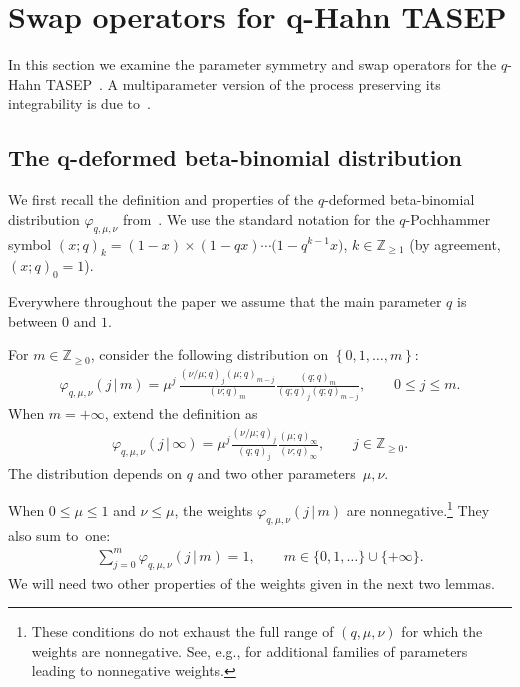 \section[Swap operators for q-Hahn TASEP]{Swap operators for $\boldsymbol q$-Hahn TASEP}\label{sec:qhahn_TASEP}

{\sloppy
In this section we examine the parameter symmetry and swap operators for the
$q$-Hahn TASEP~\cite{Povolotsky2013}.
A multiparameter version of the process
preserving its integrability is due to~\cite{BorodinPetrov2016inhom}.

}

\subsection[The q-deformed beta-binomial distribution]
{The $\boldsymbol q$-deformed beta-binomial distribution}\label{sub:phi_distribution}

We first recall the definition and properties of
the $q$-deformed beta-binomial distribution
$\varphi_{q,\mu,\nu}$ from~\cite{Corwin2014qmunu, Povolotsky2013}.
We use the standard notation for the $q$-Pochhammer symbol
$(x;q)_k=(1-x)\times(1-qx)\cdots\big(1-q^{k-1}x\big)$, $k\in \mathbb{Z}_{\ge1}$
(by agreement, $(x;q)_0=1$).

Everywhere throughout the paper we
assume that the main parameter $q$ is between $0$ and $1$.

\begin{Definition}
	\label{def:phi_distribution}
	For $m\in \mathbb{Z}_{\ge0}$, consider the following distribution on
	$\left\{ 0,1,\ldots,m \right\}$:
	\begin{gather*}
		\varphi_{q,\mu,\nu}(j\,|\, m)=
		\mu^j\,\frac{(\nu/\mu;q)_j(\mu;q)_{m-j}}{(\nu;q)_m}
		\frac{(q;q)_m}{(q;q)_j(q;q)_{m-j}},
		\qquad
		0\le j\le m.
	\end{gather*}
	When $m=+\infty$, extend the definition as
	\begin{gather*}
		\varphi_{q,\mu,\nu}(j\,|\, \infty)=
		\mu^j\frac{(\nu/\mu;q)_j}{(q;q)_j}\frac{(\mu;q)_\infty}{(\nu;q)_\infty},
		\qquad
		j\in \mathbb{Z}_{\ge0}.
	\end{gather*}
	The distribution depends on $q$
	and two other parameters~$\mu,\nu$.
\end{Definition}

When $0\le \mu\le 1$ and $\nu\le \mu$, the weights $\varphi_{q,\mu,\nu}(j\,|\, m)$
are nonnegative.\footnote{These conditions do not
exhaust the full range of $(q,\mu,\nu)$
for which the weights are nonnegative.
See, e.g., \cite[Section 6.6.1]{BorodinPetrov2016inhom}
for additional families of parameters leading to nonnegative weights.}
They also sum to~one:
\begin{gather*}
\sum_{j=0}^{m}\varphi_{q,\mu,\nu}(j\,|\, m)=1,\qquad m\in\{ 0,1,\ldots \}
\cup\{ +\infty \}.
\end{gather*}
We will need two other properties of the weights given in the next
two lemmas.

